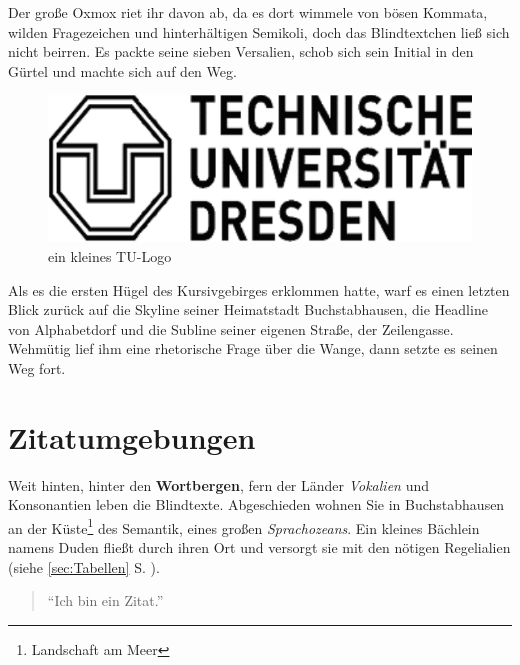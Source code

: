 \documentclass[%
	12pt,%
	a4paper,%
	oneside,%
	listof=totoc,
 	index=totoc,
	bibliography = totoc,
	parskip = half,%
	chapterprefix=false,%
	appendixprefix, %
	headings=small,%
]{scrreprt}
\begin{document}
Der große Oxmox riet ihr davon ab, da es dort wimmele von bösen Kommata, wilden Fragezeichen und hinterhältigen Semikoli, doch das Blindtextchen ließ sich nicht beirren. Es packte seine sieben Versalien, schob sich sein Initial in den Gürtel und machte sich auf den Weg.

\begin{figure}[htbp]
		\centering
		\includegraphics[scale=0.25]{images/tu_logo}%
	\caption{ein kleines TU-Logo}%
	\label{fig:kleinestulogo}
\end{figure}

Als es die ersten Hügel des Kursivgebirges erklommen hatte, warf es einen letzten Blick zurück auf die Skyline seiner Heimatstadt Buchstabhausen, die Headline von Alphabetdorf und die Subline seiner eigenen Straße, der Zeilengasse. Wehmütig lief ihm eine rhetorische Frage über die Wange, dann setzte es seinen Weg fort.

\chapter{Zitatumgebungen}
\label{sec:Zitate}

Weit hinten, hinter den \textbf{Wortbergen}, fern der Länder \textit{Vokalien} und Konsonantien leben die Blindtexte. Abgeschieden wohnen Sie in Buchstabhausen an der Küste\footnote{Landschaft am Meer}
des Semantik, eines großen \textsl{Sprachozeans}. Ein kleines Bächlein namens Duden fließt durch ihren Ort und versorgt sie mit den nötigen Regelialien (siehe \ref{sec:Tabellen} S. \pageref{sec:Tabellen}).

\begin{quotation}
	"`Ich bin ein Zitat."'
\end{quotation}
\end{document}

